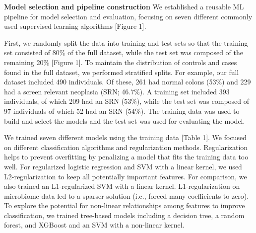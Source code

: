 \documentclass[11pt,]{article}
\begin{document}
\textbf{Model selection and pipeline construction} We established a
reusable ML pipeline for model selection and evaluation, focusing on
seven different commonly used supervised learning algorithms {[}Figure
1{]}.

First, we randomly split the data into training and test sets so that
the training set consisted of 80\% of the full dataset, while the test
set was composed of the remaining 20\% {[}Figure 1{]}. To maintain the
distribution of controls and cases found in the full dataset, we
performed stratified splits. For example, our full dataset included 490
individuals. Of these, 261 had normal colons (53\%) and 229 had a screen
relevant neoplasia (SRN; 46.7\%). A training set included 393
individuals, of which 209 had an SRN (53\%), while the test set was
composed of 97 individuals of which 52 had an SRN (54\%). The training
data was used to build and select the models and the test set was used
for evaluating the model.

We trained seven different models using the training data {[}Table 1{]}.
We focused on different classification algorithms and regularization
methods. Regularization helps to prevent overfitting by penalizing a
model that fits the training data too well. For regularized logistic
regression and SVM with a linear kernel, we used L2-regularization to
keep all potentially important features. For comparison, we also trained
an L1-regularized SVM with a linear kernel. L1-regularization on
microbiome data led to a sparser solution (i.e., forced many
coefficients to zero). To explore the potential for non-linear
relationships among features to improve classification, we trained
tree-based models including a decision tree, a random forest, and
XGBoost and an SVM with a non-linear kernel.
\end{document}
